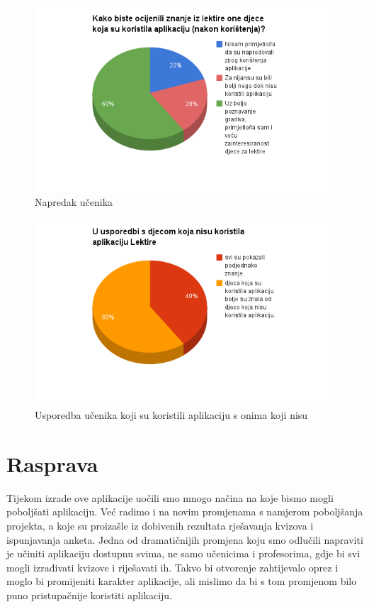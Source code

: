 \documentclass{scrreprt}
\begin{document}
\begin{figure}[H]
  \includegraphics[width=\textwidth, clip=true, trim=0 2.5cm 0 0]{advance}
  \caption{Napredak učenika}
\end{figure}

\begin{figure}[H]
  \includegraphics[width=\textwidth, clip=true, trim=0 2.5cm 0 0]{comparison}
  \caption{Usporedba učenika koji su koristili aplikaciju s onima koji nisu}
\end{figure}

\chapter{Rasprava}


Tijekom izrade ove aplikacije uočili smo mnogo načina na koje bismo mogli
poboljšati aplikaciju. Već radimo i na novim promjenama s namjerom poboljšanja
projekta, a koje su proizašle iz dobivenih rezultata rješavanja kvizova i
ispunjavanja anketa. Jedna od dramatičnijih promjena koju smo odlučili napraviti
je učiniti aplikaciju dostupnu svima, ne samo učenicima i profesorima, gdje bi
svi mogli izrađivati kvizove i riješavati ih. Takvo bi otvorenje zahtijevalo
oprez i moglo bi promijeniti karakter aplikacije, ali mislimo da bi s tom
promjenom bilo puno pristupačnije koristiti aplikaciju.
\end{document}
